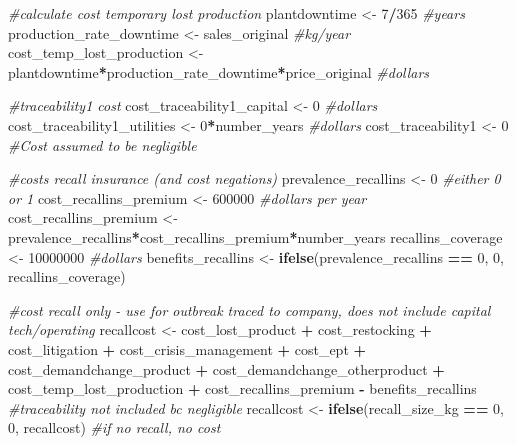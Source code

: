 \documentclass[
]{article}
\newenvironment{Shaded}{\begin{snugshade}}{\end{snugshade}}
\newcommand{\CommentTok}[1]{\textcolor[rgb]{0.56,0.35,0.01}{\textit{#1}}}
\newcommand{\DecValTok}[1]{\textcolor[rgb]{0.00,0.00,0.81}{#1}}
\newcommand{\FunctionTok}[1]{\textcolor[rgb]{0.13,0.29,0.53}{\textbf{#1}}}
\newcommand{\NormalTok}[1]{#1}
\newcommand{\OtherTok}[1]{\textcolor[rgb]{0.56,0.35,0.01}{#1}}
\newcommand{\SpecialCharTok}[1]{\textcolor[rgb]{0.81,0.36,0.00}{\textbf{#1}}}
\begin{document}
\begin{Shaded}
\begin{Highlighting}[]
\CommentTok{\#calculate cost temporary lost production}
\NormalTok{plantdowntime }\OtherTok{\textless{}{-}} \DecValTok{7}\SpecialCharTok{/}\DecValTok{365} \CommentTok{\#years}
\NormalTok{production\_rate\_downtime }\OtherTok{\textless{}{-}}\NormalTok{ sales\_original }\CommentTok{\#kg/year}
\NormalTok{cost\_temp\_lost\_production }\OtherTok{\textless{}{-}}\NormalTok{ plantdowntime}\SpecialCharTok{*}\NormalTok{production\_rate\_downtime}\SpecialCharTok{*}\NormalTok{price\_original }\CommentTok{\#dollars}


\CommentTok{\#traceability1 cost}
\NormalTok{cost\_traceability1\_capital }\OtherTok{\textless{}{-}} \DecValTok{0} \CommentTok{\#dollars}
\NormalTok{cost\_traceability1\_utilities }\OtherTok{\textless{}{-}} \DecValTok{0}\SpecialCharTok{*}\NormalTok{number\_years }\CommentTok{\#dollars}
\NormalTok{cost\_traceability1 }\OtherTok{\textless{}{-}} \DecValTok{0} \CommentTok{\#Cost assumed to be negligible }


\CommentTok{\#costs recall insurance (and cost negations)}
\NormalTok{prevalence\_recallins }\OtherTok{\textless{}{-}} \DecValTok{0} \CommentTok{\#either 0 or 1}
\NormalTok{cost\_recallins\_premium }\OtherTok{\textless{}{-}} \DecValTok{600000} \CommentTok{\#dollars per year}
\NormalTok{cost\_recallins\_premium }\OtherTok{\textless{}{-}}\NormalTok{ prevalence\_recallins}\SpecialCharTok{*}\NormalTok{cost\_recallins\_premium}\SpecialCharTok{*}\NormalTok{number\_years}
\NormalTok{recallins\_coverage }\OtherTok{\textless{}{-}} \DecValTok{10000000} \CommentTok{\#dollars}
\NormalTok{benefits\_recallins }\OtherTok{\textless{}{-}} \FunctionTok{ifelse}\NormalTok{(prevalence\_recallins }\SpecialCharTok{==} \DecValTok{0}\NormalTok{, }\DecValTok{0}\NormalTok{, recallins\_coverage)}

\CommentTok{\#cost recall only {-} use for outbreak traced to company, does not include capital tech/operating }
\NormalTok{recallcost }\OtherTok{\textless{}{-}}\NormalTok{ cost\_lost\_product }\SpecialCharTok{+}\NormalTok{ cost\_restocking }\SpecialCharTok{+}\NormalTok{ cost\_litigation }\SpecialCharTok{+}\NormalTok{ cost\_crisis\_management }\SpecialCharTok{+}\NormalTok{ cost\_ept }\SpecialCharTok{+}\NormalTok{ cost\_demandchange\_product }\SpecialCharTok{+}\NormalTok{ cost\_demandchange\_otherproduct }\SpecialCharTok{+}\NormalTok{ cost\_temp\_lost\_production }\SpecialCharTok{+}\NormalTok{ cost\_recallins\_premium  }\SpecialCharTok{{-}}\NormalTok{ benefits\_recallins }\CommentTok{\#traceability not included bc negligible}
\NormalTok{recallcost }\OtherTok{\textless{}{-}} \FunctionTok{ifelse}\NormalTok{(recall\_size\_kg }\SpecialCharTok{==} \DecValTok{0}\NormalTok{, }\DecValTok{0}\NormalTok{, recallcost) }\CommentTok{\#if no recall, no cost}



\end{Highlighting}
\end{Shaded}
\end{document}
